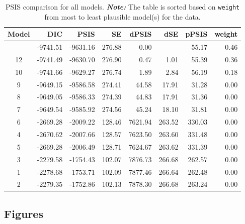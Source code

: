 \documentclass[
  authoryear,
  preprint,
  1p]{elsarticle}
\begin{document}
\begin{longtable}[]{@{}crrrrrrr@{}}

\caption{\label{tbl-rq3-psis}PSIS comparison for all models.
\textbf{\emph{Note:}} The table is sorted based on \texttt{weight} from
most to least plausible model(s) for the data.}

\tabularnewline

\toprule\noalign{}
Model & DIC & PSIS & SE & dPSIS & dSE & pPSIS & weight \\
\midrule\noalign{}
\endhead
\bottomrule\noalign{}
\endlastfoot
11 & -9741.51 & -9631.16 & 276.88 & 0.00 & & 55.17 & 0.46 \\
12 & -9741.49 & -9630.70 & 276.90 & 0.47 & 1.01 & 55.39 & 0.36 \\
10 & -9741.66 & -9629.27 & 276.74 & 1.89 & 2.84 & 56.19 & 0.18 \\
9 & -9649.15 & -9586.58 & 274.41 & 44.58 & 17.91 & 31.28 & 0.00 \\
8 & -9649.05 & -9586.33 & 274.39 & 44.83 & 17.91 & 31.36 & 0.00 \\
7 & -9649.54 & -9585.92 & 274.56 & 45.24 & 18.10 & 31.81 & 0.00 \\
6 & -2669.28 & -2009.22 & 128.46 & 7621.94 & 263.52 & 330.03 & 0.00 \\
4 & -2670.62 & -2007.66 & 128.57 & 7623.50 & 263.60 & 331.48 & 0.00 \\
5 & -2669.28 & -2006.49 & 128.71 & 7624.67 & 263.62 & 331.39 & 0.00 \\
3 & -2279.58 & -1754.43 & 102.07 & 7876.73 & 266.68 & 262.57 & 0.00 \\
1 & -2278.68 & -1753.71 & 102.09 & 7877.46 & 266.64 & 262.48 & 0.00 \\
2 & -2279.35 & -1752.86 & 102.13 & 7878.30 & 266.68 & 263.24 & 0.00 \\

\end{longtable}

\newpage{}

\subsection{Figures}\label{sec-appC}
\end{document}
